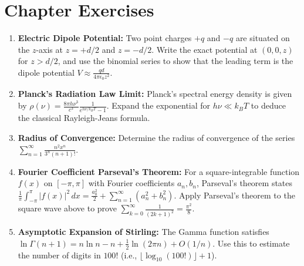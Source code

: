 \section{Chapter Exercises}
\begin{enumerate}
    \item \textbf{Electric Dipole Potential:} Two point charges $+q$ and $-q$ are situated on the $z$-axis at $z = +d/2$ and $z = -d/2$. Write the exact potential at $(0, 0, z)$ for $z > d/2$, and use the binomial series to show that the leading term is the dipole potential $V \approx \frac{q d}{4\pi\epsilon_0 z^2}$.
    \item \textbf{Planck's Radiation Law Limit:} Planck's spectral energy density is given by $\rho(\nu) = \frac{8\pi h\nu^3}{c^3}\frac{1}{e^{h\nu/k_B T} - 1}$. Expand the exponential for $h\nu \ll k_B T$ to deduce the classical Rayleigh-Jeans formula.
    \item \textbf{Radius of Convergence:} Determine the radius of convergence of the series $\sum_{n=1}^\infty \frac{n^2 x^n}{3^n (n+1)!}$.
    \item \textbf{Fourier Coefficient Parseval's Theorem:} For a square-integrable function $f(x)$ on $[-\pi, \pi]$ with Fourier coefficients $a_n, b_n$, Parseval's theorem states $\frac{1}{\pi}\int_{-\pi}^{\pi}|f(x)|^2\,dx = \frac{a_0^2}{2} + \sum_{n=1}^{\infty}(a_n^2 + b_n^2)$. Apply Parseval's theorem to the square wave above to prove $\sum_{k=0}^\infty \frac{1}{(2k+1)^2} = \frac{\pi^2}{8}$.
    \item \textbf{Asymptotic Expansion of Stirling:} The Gamma function satisfies $\ln\Gamma(n+1) = n\ln n - n + \frac{1}{2}\ln(2\pi n) + O(1/n)$. Use this to estimate the number of digits in $100!$ (i.e., $\lfloor \log_{10}(100!) \rfloor + 1$).
\end{enumerate}
